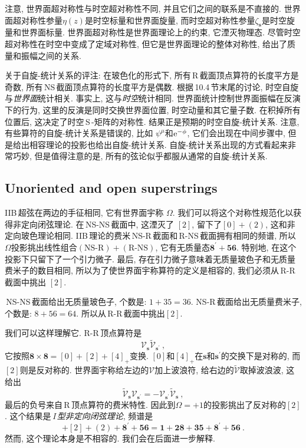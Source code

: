注意, 世界面超对称性与时空超对称性不同, 并且它们之间的联系是不直接的. 世界面超对称性参量$ \eta(z) $是时空标量和世界面旋量, 而时空超对称性参量$ \zeta_{\mathbf{s}} $是时空旋量和世界面标量. 世界面超对称性是世界面理论上的约束, 它湮灭物理态. 尽管时空超对称性在时空中变成了定域对称性, 但它是世界面理论的整体对称性, 给出了质量和振幅之间的关系. 

关于自旋-统计关系的评注: 在玻色化的形式下, 所有\,R\,截面顶点算符的长度平方是奇数, 所有\,NS\,截面顶点算符的长度平方是偶数. 根据\,10.4\,节末尾的讨论, 时空自旋与{\emph{世界面}}统计相关. 事实上, 这与{\emph{时空}}统计相同. 世界面统计控制世界面振幅在反演下的行为, 这里的反演是同时交换世界面位置, 时空动量和其它量子数. 在积掉所有位置后, 这决定了时空\,S\,-矩阵的对称性. 结果正是预期的时空自旋-统计关系. 注意, 有些算符的自旋-统计关系是错误的, 比如 $\psi^{\mu} $和$ \mathrm{e}^{-\phi}$, 它们会出现在中间步骤中, 但是给出相容理论的投影也给出自旋-统计关系. 自旋-统计关系出现的方式看起来非常巧妙, 但是值得注意的是, 所有的弦论似乎都服从通常的自旋-统计关系.  


\subsection*{Unoriented and open superstrings}

IIB\,超弦在两边的手征相同, 它有世界面宇称 $\Omega$. 我们可以将这个对称性规范化以获得非定向闭弦理论. 在\,NS-NS\,截面中, 这湮灭了 $[2]$, 留下了$ [0]+(2)$, 这和非定向玻色理论相同. IIB\,理论的费米\,NS-R\,截面和\,R-NS\,截面拥有相同的频谱, 所以$ \Omega $投影挑出线性组合$ (\text{NS-R})+(\text{R-NS})$, 它有无质量态$ \mathbf{8}^{\prime}+\mathbf{56}$. 特别地, 在这个投影下只留下了一个引力微子. 最后, 存在引力微子意味着无质量玻色子和无质量费米子的数目相同, 所以为了使世界面宇称算符的定义是相容的, 我们必须从\,R-R\,截面中挑出 $[2]$. 
\begin{tcolorbox}
\,NS-NS\,截面给出无质量玻色子, 个数是: $1+35=36$. NS-R\,截面给出无质量费米子, 个数是: $8+56=64$. 所以从\,R-R\,截面中挑出$ [2]$.
\end{tcolorbox}
\noindent 我们可以这样理解它. R-R\,顶点算符是
\begin{equation}
    \mathscr{V}_{\mathbf{s}}\tilde{\mathscr{V}}_{\mathbf{s}^{\prime}} \:, \label{10.6.16}
\end{equation}
它按照$ \mathbf{8}\times\mathbf{8}=[0]+[2]+[4]_{+} $变换. $[0] $和$ [4]_{+} $在$ \mathbf{s} $和$ \mathbf{s}^{\prime} $的交换下是对称的, 而$ [2] $则是反对称的. 世界面宇称给左边的$ \mathscr{V} $加上波浪符, 给右边的$ \tilde{\mathscr{V}} $取掉波浪波, 这给出
\begin{equation}
    \tilde{\mathscr{V}}_{\mathbf{s}}\mathscr{V}_{\mathbf{s}^{\prime}}
    =-\mathscr{V}_{\mathbf{s}^{\prime}}\tilde{\mathscr{V}}_{\mathbf{s}}\:, \label{10.6.17}
\end{equation}
最后的负号来自\,R\,顶点算符的费米特性. 因此到$ \Omega=+1 $的投影挑出了反对称的$ [2]$. 这个结果是\,\emph{I}\,{\emph{型非定向闭弦理论}}, 频谱是
\begin{equation}
    [0]+[2]+(2)+\mathbf{8}^{\prime}+\mathbf{56} = \mathbf{1}+\mathbf{28}+\mathbf{35}+\mathbf{8}^{\prime}+\mathbf{56}\:.\label{10.6.18}
\end{equation}
然而, 这个理论本身是不相容的. 我们会在后面进一步解释.

